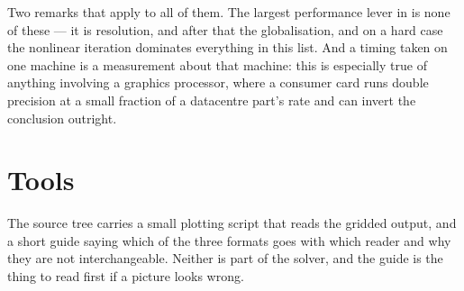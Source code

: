 Two remarks that apply to all of them. The largest performance lever in {\meq}
is none of these --- it is resolution, and after that the globalisation, and on
a hard case the nonlinear iteration dominates everything in this list. And a
timing taken on one machine is a measurement about that machine: this is
especially true of anything involving a graphics processor, where a consumer
card runs double precision at a small fraction of a datacentre part's rate and
can invert the conclusion outright.

\section{Tools}

The source tree carries a small plotting script that reads the gridded output,
and a short guide saying which of the three formats goes with which reader and
why they are not interchangeable. Neither is part of the solver, and the guide
is the thing to read first if a picture looks wrong.
